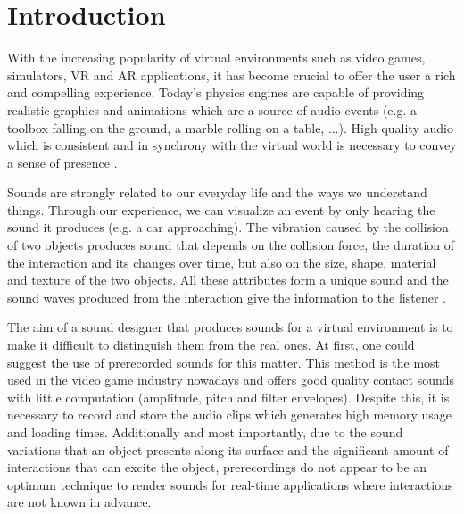 \chapter{Introduction}

With the increasing popularity of virtual environments such as video games, simulators, \gls{VR} and \gls{AR} applications, it has become crucial to offer the user a rich and compelling experience. Today's physics engines are capable of providing realistic graphics and animations which are a source of audio events (e.g. a toolbox falling on the ground, a marble rolling on a table, ...). High quality audio which is consistent and in synchrony with the virtual world is necessary to convey a sense of presence \cite{larsson2002better}.  

Sounds are strongly related to our everyday life and the ways we understand things. Through our experience, we can visualize an event by only hearing the sound it produces (e.g. a car approaching). The vibration caused by the collision of two objects produces sound that depends on the collision force, the duration of the interaction and its changes over time, but also on the size, shape, material and texture of the two objects. All these attributes form a unique sound and the sound waves produced from the interaction give the information to the listener \cite{gaver1993world}.

The aim of a sound designer that produces sounds for a virtual environment is to make it difficult to distinguish them from the real ones. At first, one could suggest the use of prerecorded sounds for this matter. This method is the most used in the video game industry nowadays and offers good quality contact sounds with little computation (amplitude, pitch and filter envelopes). Despite this, it is necessary to record and store the audio clips which generates high memory usage and loading times. Additionally and most importantly, due to the sound variations that an object presents along its surface and the significant amount of interactions that can excite the object, prerecordings do not appear to be an optimum technique to render sounds for real-time applications where interactions are not known in advance\cite{verron2010synthese, van2001foleyautomatic}. 


